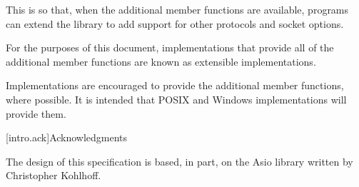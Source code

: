 \pnum
 \begin{note} This is so that, when the additional member functions are available, \Cpp programs can extend the library to add support for other protocols and socket options. \end{note}

\pnum
For the purposes of this document, implementations that provide all of the additional member functions are known as extensible implementations.

\pnum
 \begin{note} Implementations are encouraged to provide the additional member functions, where possible. It is intended that POSIX and Windows implementations will provide them. \end{note}


[intro.ack]{Acknowledgments}

\pnum
The design of this specification is based, in part, on the Asio library
written by Christopher Kohlhoff.

